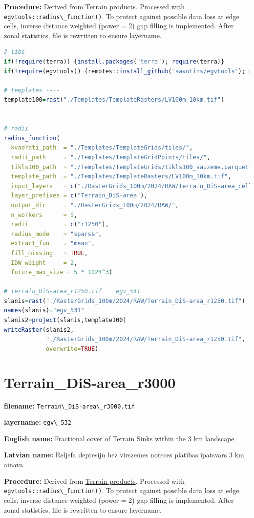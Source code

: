 \documentclass[
]{book}
\newcommand{\passthrough}[1]{#1}
\begin{document}
\textbf{Procedure:} Derived from \hyperref[Ch05.01]{Terrain products}. Processed
with \passthrough{\lstinline!egvtools::radius\_function()!}. To protect against
possible data loss at edge cells, inverse distance weighted (power = 2) gap filling
is implemented. After zonal statistics, file is rewritten to ensure layername.

\begin{lstlisting}[language=R]
# libs ----
if(!require(terra)) {install.packages("terra"); require(terra)}
if(!require(egvtools)) {remotes::install_github("aavotins/egvtools"); require(egvtools)}

# templates ----
template100=rast("./Templates/TemplateRasters/LV100m_10km.tif")


# radii
radius_function(
  kvadrati_path  = "./Templates/TemplateGrids/tiles/",
  radii_path     = "./Templates/TemplateGridPoints/tiles/",
  tikls100_path  = "./Templates/TemplateGrids/tikls100_sauzeme.parquet",
  template_path  = "./Templates/TemplateRasters/LV100m_10km.tif",
  input_layers   = c("./RasterGrids_100m/2024/RAW/Terrain_DiS-area_cell.tif"),
  layer_prefixes = c("Terrain_DiS-area"),
  output_dir     = "./RasterGrids_100m/2024/RAW/",
  n_workers      = 5,
  radii          = c("r1250"),
  radius_mode    = "sparse",
  extract_fun    = "mean",
  fill_missing   = TRUE,
  IDW_weight     = 2,
  future_max_size = 5 * 1024^3)

# Terrain_DiS-area_r1250.tif    egv_531
slanis=rast("./RasterGrids_100m/2024/RAW/Terrain_DiS-area_r1250.tif")
names(slanis)="egv_531"
slanis2=project(slanis,template100)
writeRaster(slanis2,
            "./RasterGrids_100m/2024/RAW/Terrain_DiS-area_r1250.tif",
            overwrite=TRUE)
\end{lstlisting}

\section{Terrain\_DiS-area\_r3000}\label{ch06.532}

\textbf{filename:} \passthrough{\lstinline!Terrain\_DiS-area\_r3000.tif!}

\textbf{layername:} \passthrough{\lstinline!egv\_532!}

\textbf{English name:} Fractional cover of Terrain Sinks within the 3 km landscape

\textbf{Latvian name:} Reljefa depresiju bez virszemes noteces platības īpatsvars 3 km ainavā

\textbf{Procedure:} Derived from \hyperref[Ch05.01]{Terrain products}. Processed
with \passthrough{\lstinline!egvtools::radius\_function()!}. To protect against
possible data loss at edge cells, inverse distance weighted (power = 2) gap filling
is implemented. After zonal statistics, file is rewritten to ensure layername.
\end{document}
